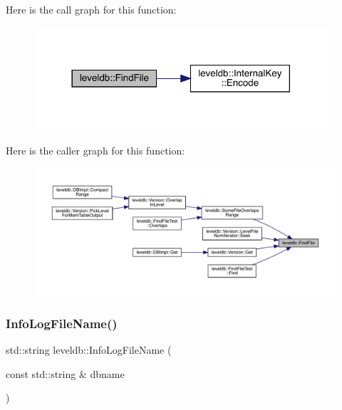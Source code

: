 Here is the call graph for this function\+:
\nopagebreak
\begin{figure}[H]
\begin{center}
\leavevmode
\includegraphics[width=309pt]{namespaceleveldb_a812c4c6cf8299e767535a59f2205df0c_cgraph}
\end{center}
\end{figure}
Here is the caller graph for this function\+:
\nopagebreak
\begin{figure}[H]
\begin{center}
\leavevmode
\includegraphics[width=350pt]{namespaceleveldb_a812c4c6cf8299e767535a59f2205df0c_icgraph}
\end{center}
\end{figure}
\mbox{\label{namespaceleveldb_ac40453ca7f9c0bd723873ffe32dc12a2}} 
\subsubsection{\texorpdfstring{InfoLogFileName()}{InfoLogFileName()}}
{\footnotesize\ttfamily std\+::string leveldb\+::\+Info\+Log\+File\+Name (\begin{DoxyParamCaption}\item[{const std\+::string \&}]{dbname }\end{DoxyParamCaption})}


